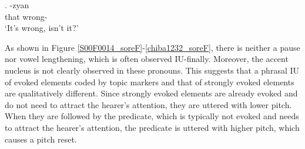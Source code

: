 \exg. \label{chiba1232_sore} \tp{\dvline} -zyan \tp{\dvline} \\
		that {} wrong- {} \\
		`It's wrong, isn't it?'

As shown in Figure \ref{S00F0014_soreF}-\ref{chiba1232_soreF},
there is neither a pause nor vowel lengthening,
which is often observed IU-finally.
Moreover, the accent nucleus is not clearly observed in these pronouns.
This suggests that
a phrasal IU of evoked elements coded by topic markers and
that of strongly evoked elements are qualitatively different.
Since strongly evoked elements are already evoked and do not need to attract the hearer's attention,
they are uttered with lower pitch.
When they are followed by the predicate, which is typically not evoked and needs to attract the hearer's attention,
the predicate is uttered with higher pitch,
which causes a pitch reset.



